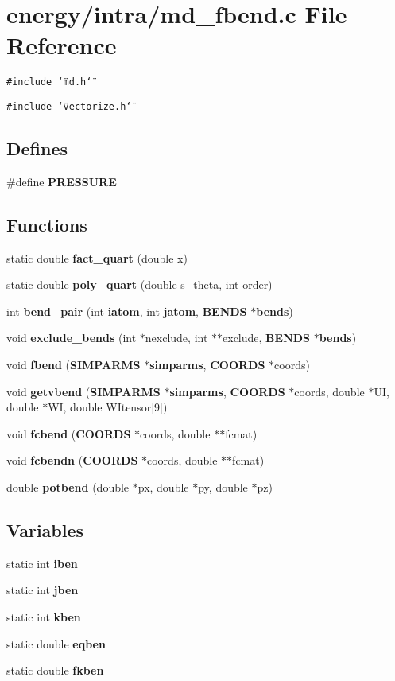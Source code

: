 \section{energy/intra/md\_\-fbend.c File Reference}
\label{md__fbend_8c}
{\tt \#include \char`\"{}md.h\char`\"{}}\par
{\tt \#include \char`\"{}vectorize.h\char`\"{}}\par
\subsection*{Defines}
\begin{CompactItemize}
\item 
\#define {\bf PRESSURE}
\end{CompactItemize}
\subsection*{Functions}
\begin{CompactItemize}
\item 
static double {\bf fact\_\-quart} (double x)
\item 
static double {\bf poly\_\-quart} (double s\_\-theta, int order)
\item 
int {\bf bend\_\-pair} (int {\bf iatom}, int {\bf jatom}, {\bf BENDS} $\ast${\bf bends})
\item 
void {\bf exclude\_\-bends} (int $\ast$nexclude, int $\ast$$\ast$exclude, {\bf BENDS} $\ast${\bf bends})
\item 
void {\bf fbend} ({\bf SIMPARMS} $\ast${\bf simparms}, {\bf COORDS} $\ast$coords)
\item 
void {\bf getvbend} ({\bf SIMPARMS} $\ast${\bf simparms}, {\bf COORDS} $\ast$coords, double $\ast$UI, double $\ast$WI, double WItensor[9])
\item 
void {\bf fcbend} ({\bf COORDS} $\ast$coords, double $\ast$$\ast$fcmat)
\item 
void {\bf fcbendn} ({\bf COORDS} $\ast$coords, double $\ast$$\ast$fcmat)
\item 
double {\bf potbend} (double $\ast$px, double $\ast$py, double $\ast$pz)
\end{CompactItemize}
\subsection*{Variables}
\begin{CompactItemize}
\item 
static int {\bf iben}
\item 
static int {\bf jben}
\item 
static int {\bf kben}
\item 
static double {\bf eqben}
\item 
static double {\bf fkben}
\end{CompactItemize}


